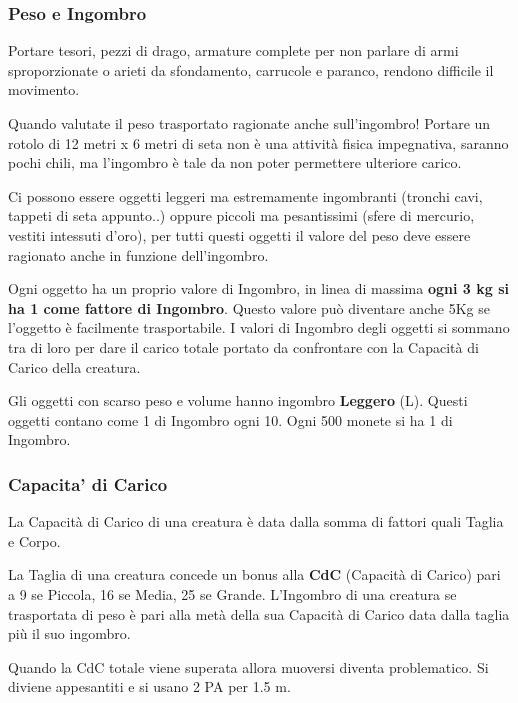\documentclass[12pt,a4paper,twoside,openany]{book}
\begin{document}
\begin{multicols}{2}
\label{sec:capacita-di-carico-e-trasporto-ingombro}

\subsubsection{Peso e Ingombro}

Portare tesori, pezzi di drago, armature complete per non parlare di armi sproporzionate o arieti da sfondamento, carrucole e paranco, rendono difficile il movimento.

Quando valutate il peso trasportato ragionate anche sull'ingombro!
Portare un rotolo di 12 metri x 6 metri di seta non è una attività fisica impegnativa, saranno pochi chili, ma l'ingombro è tale da non poter permettere ulteriore carico.

Ci possono essere oggetti leggeri ma estremamente ingombranti (tronchi cavi, tappeti di seta appunto..) oppure piccoli ma pesantissimi (sfere di mercurio, vestiti intessuti d'oro), per tutti questi oggetti il valore del peso deve essere ragionato anche in funzione dell'ingombro.

Ogni oggetto ha un proprio valore di Ingombro, in linea di massima \textbf{ogni 3 kg si ha 1 come fattore di Ingombro}. Questo valore può diventare anche 5Kg se l'oggetto è facilmente trasportabile. I valori di Ingombro degli oggetti si sommano tra di loro per dare il carico totale portato da confrontare con la Capacità di Carico della creatura.

Gli oggetti con scarso peso e volume hanno ingombro \textbf{Leggero} (L). Questi oggetti contano come 1 di Ingombro ogni 10. Ogni 500 monete si ha 1 di Ingombro.


\subsubsection{Capacita' di Carico}\label{capacitadicarico}

La Capacità di Carico di una creatura è data dalla somma di fattori quali Taglia e Corpo.

La Taglia di una creatura concede un bonus alla \textbf{CdC} (Capacità di Carico) pari a 9 se Piccola, 16 se Media, 25 se Grande. L'Ingombro di una creatura se trasportata di peso è pari alla metà della sua Capacità di Carico data dalla taglia più il suo ingombro.

Quando la CdC totale viene superata allora muoversi diventa problematico.  Si diviene appesantiti e si usano 2 PA per 1.5 m. 


\end{multicols}
\end{document}
